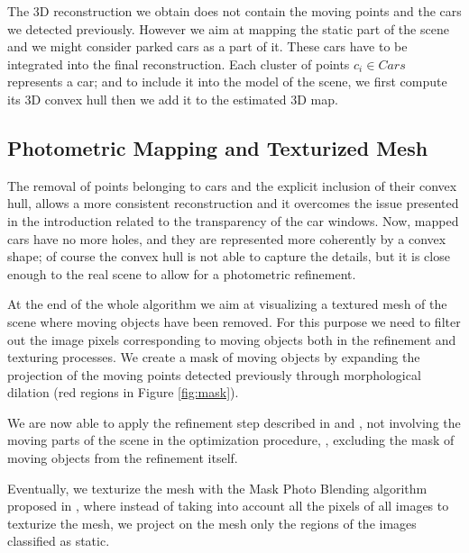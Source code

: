 The 3D reconstruction we obtain does not contain the moving points and the cars we detected previously. 
However we aim at mapping the static part of the scene and we might consider parked cars as a part of it.
These cars have to be integrated into the final reconstruction. 
Each cluster of points $c_i \in Cars$ represents a car; and to include it into the model of the scene, we first compute its 3D convex hull then we add it to the estimated 3D map.

\subsection{Photometric Mapping and Texturized Mesh}
The removal of points belonging to cars and the explicit inclusion of their convex hull, allows a more consistent reconstruction and it overcomes the issue presented in the introduction related to the transparency of the car windows. Now, mapped cars have no more holes, and they are represented more coherently by a convex shape; of course the convex hull is not able to capture the details, but it is close enough to the real scene to allow for a photometric refinement.

At the end of the whole algorithm we aim at visualizing a textured mesh of the scene where moving objects have been removed. 
For this purpose we need to filter out the image pixels corresponding to moving objects both in the refinement and texturing processes.
We create a mask of moving objects by expanding the projection of the moving points detected previously through morphological dilation (red regions in Figure \ref{fig:mask}). 

We are now able to apply the refinement step described in \cite{vu_et_al_2012} and \cite{romanoni16}, not involving the moving parts of the scene in the optimization procedure, \ie, excluding the mask of moving objects from the refinement itself.

Eventually, we texturize the mesh with the Mask Photo Blending algorithm proposed in \cite{callieri2008masked}, where instead of taking into account all the pixels of all images to texturize the mesh, we project on the mesh only the regions of the images classified as static. 


